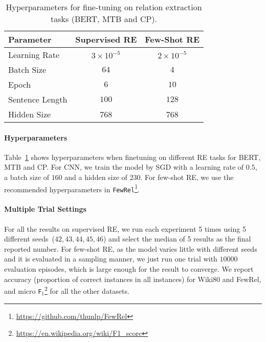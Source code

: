 \documentclass[11pt,a4paper]{article}
\begin{document}
\begin{table}[t]
    \small
    \centering
    \begin{tabular}{l|cc}
        \toprule
        \textbf{Parameter} & \textbf{Supervised RE} &  \textbf{Few-Shot RE} \\
        \midrule 
        Learning Rate & $3\times10^{-5}$ & $2\times10^{-5}$\\
        Batch Size & $64$ & $4$ \\
        Epoch & $6$ & $10$ \\
        Sentence Length & $100$ & $128$\\
        Hidden Size & 768 & 768 \\
        \bottomrule
    \end{tabular}
    \caption{Hyperparameters for fine-tuning on relation extraction tasks (BERT, MTB and CP).}
    \label{tab:task_params}
\end{table}

\paragraph{Hyperparameters} 



Table~\ref{tab:task_params} shows hyperparameters when finetuning on different RE tasks for BERT, MTB and CP. For CNN, we train the model by SGD with a learning rate of $0.5$, a batch size of $160$ and a hidden size of $230$.
For few-shot RE, we use the recommended hyperparameters in \texttt{FewRel}\footnote{\url{https://github.com/thunlp/FewRel}}.






\paragraph{Multiple Trial Settings}  For all the results on supervised RE, we run each experiment 5 times using 5 different seeds~($42,43,44,45,46$) and select the median of 5 results as the final reported number. For few-shot RE, as the model varies little with different seeds and it is evaluated in a sampling manner, we just run one trial with $10000$ evaluation episodes, which is large enough for the result to converge. We report accuracy (proportion of correct instances in all instances) for Wiki80 and FewRel, and micro \texttt{F$_1$}\footnote{\url{https://en.wikipedia.org/wiki/F1_score}} for all the other datasets.










\end{document}
